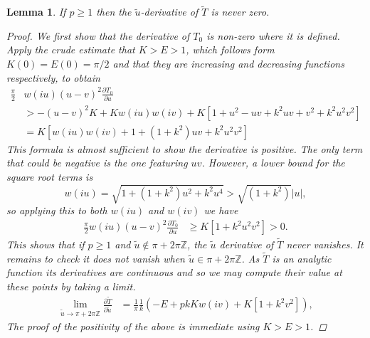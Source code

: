 \documentclass{article}
\numberwithin{equation}{section}
\numberwithin{figure}{section}
\newtheorem{lem}[equation]{Lemma}
\newcommand{\bra}[1]{\left(#1\right)}
\newcommand{\abs}[1]{\left|#1\right|}
\newcommand{\Partial}[2]{\frac{\partial #1}{\partial #2}}
\newcommand{\iu}{i}
\newcommand{\Z}{\mathbb{Z}}
\begin{document}
\begin{lem}\label{lem:dTdu_nonzero}
If $p \geq 1$ then the $\tilde{u}$-derivative of $\tilde{T}$ is never zero.

\begin{proof}
We first show that the derivative of $T_0$ is non-zero where it is defined. Apply the crude estimate that $K>E>1$,
which follows form $K(0)=E(0)=\pi/2$ and that they are increasing and decreasing functions respectively, to obtain
\begin{align*}
\frac{\pi}{2}&w(\iu u)(u-v)^2\Partial{T_0}{u}\\
&> -(u-v)^2 K + Kw(\iu u)w(\iu v) + K\left[ 1 + u^2 - uv + k^2 uv + v^2 + k^2 u^2 v^2 \right] \\
&= K \left[ w(\iu u)w(\iu v) + 1 + (1 + k^2) uv + k^2 u^2 v^2 \right]
\end{align*}
This formula is almost sufficient to show the derivative is positive. The only term that could be negative is the one featuring $uv$. However, a lower bound for the square root terms is
\[
w(\iu u) = \sqrt{1 + (1+k^2)u^2 + k^2u^4} > \sqrt{(1+k^2)}\abs{u},
\]
so applying this to both $w(\iu u)$ and $w(\iu v)$ we have
\begin{align*}
\frac{\pi}{2}w(\iu u)(u-v)^2\Partial{T_0}{u}
&\geq K \left[ 1 + k^2 u^2 v^2 \right] >0.
\end{align*}
This shows that if $p\geq 1$ and $\tilde{u} \not\in \pi + 2\pi\Z$, the $\tilde{u}$ derivative of $\tilde{T}$ never vanishes. It remains to check it does not vanish when $\tilde{u} \in \pi + 2\pi\Z$. As $\tilde{T}$ is an analytic function its derivatives are continuous and so we may compute their value at these points by taking a limit.
\begin{align*}
\lim_{\tilde{u}\to \pi + 2\pi\Z} \Partial{\tilde{T}}{\tilde{u}}
&=\frac{1}{\pi} \frac{1}{k} \left(-E + pkKw(\iu v) + K\left[ 1 + k^2v^2 \right]\right),
\end{align*}
The proof of the positivity of the above is immediate using $K>E>1$.
\end{proof}
\end{lem}
\end{document}
